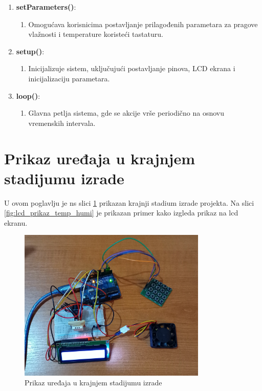 \documentclass[a4paper, 12pt]{article}
\begin{document}
\begin{enumerate}[label=\arabic*.,leftmargin=*]
    \item \textbf{setParameters()}:
        \begin{enumerate}[label={},leftmargin=*] 
            \item Omogućava korisnicima postavljanje prilagođenih parametara za pragove vlažnosti i temperature koristeći tastaturu.
        \end{enumerate}
        
    \item \textbf{setup()}:
        \begin{enumerate}[label={},leftmargin=*]
        		\sloppypar
            \item Inicijalizuje sistem, uključujući postavljanje pinova, LCD ekrana i inicijalizaciju parametara.
        \end{enumerate}
        
    \item \textbf{loop()}:
        \begin{enumerate}[label={},leftmargin=*] 
            \item Glavna petlja sistema, gde se akcije vrše periodično na osnovu vremenskih intervala.
        \end{enumerate}
\end{enumerate}

\pagebreak
\endgroup

\begingroup
\justifying
\section{Prikaz uređaja u krajnjem stadijumu izrade}

\vspace{10pt}

U ovom poglavlju je ns slici \ref{fig:krajnji_prikaz} prikazan krajnji stadium izrade projekta. Na slici \ref{fig:lcd_prikaz_temp_humi} je prikazan primer kako izgleda prikaz na lcd ekranu.

\vspace{10pt}

\begin{figure}[H]
\centering
\includegraphics[width=0.8\textwidth]{images/krajnji_prikaz}
\caption{Prikaz uređaja u krajnjem stadijumu izrade}\label{fig:krajnji_prikaz}
\end{figure}
\end{document}
